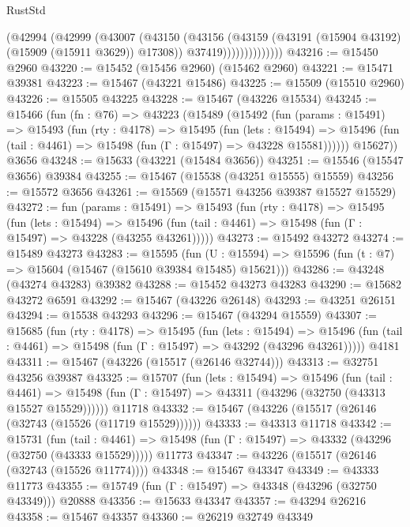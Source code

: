 \begin{lexlean}{RustStd}
\begin{coremodule}
                      (@42994
                        (@42999
                          (@43007
                            (@43150
                              (@43156
                                (@43159 (@43191 (@15904 @43192) (@15909 (@15911 @3629)) @17308))
                                @37419))))))))))))))
@43216 := @15450 @2960
@43220 := @15452 (@15456 @2960) (@15462 @2960)
@43221 := @15471 @39381
@43223 := @15467 (@43221 @15486)
@43225 := @15509 (@15510 @2960)
@43226 := @15505 @43225
@43228 := @15467 (@43226 @15534)
@43245 := @15466
    (fun (fn : @76) =>
    @43223
      (@15489
        (@15492
          (fun (params : @15491) =>
          @15493
            (fun (rty : @4178) =>
            @15495
              (fun (lets : @15494) =>
              @15496 (fun (tail : @4461) => @15498 (fun (Γ : @15497) => @43228 @15581))))))
        @15627))
    @3656
@43248 := @15633 (@43221 (@15484 @3656))
@43251 := @15546 (@15547 @3656) @39384
@43255 := @15467 (@15538 (@43251 @15555) @15559)
@43256 := @15572 @3656
@43261 := @15569 (@15571 @43256 @39387 @15527 @15529)
@43272 := fun (params : @15491) =>
  @15493
    (fun (rty : @4178) =>
    @15495
      (fun (lets : @15494) =>
      @15496 (fun (tail : @4461) => @15498 (fun (Γ : @15497) => @43228 (@43255 @43261)))))
@43273 := @15492 @43272
@43274 := @15489 @43273
@43283 := @15595
    (fun (U : @15594) => @15596 (fun (t : @7) => @15604 (@15467 (@15610 @39384 @15485) @15621)))
@43286 := @43248 (@43274 @43283) @39382
@43288 := @15452 @43273 @43283
@43290 := @15682 @43272 @6591
@43292 := @15467 (@43226 @26148)
@43293 := @43251 @26151
@43294 := @15538 @43293
@43296 := @15467 (@43294 @15559)
@43307 := @15685
    (fun (rty : @4178) =>
    @15495
      (fun (lets : @15494) =>
      @15496 (fun (tail : @4461) => @15498 (fun (Γ : @15497) => @43292 (@43296 @43261)))))
    @4181
@43311 := @15467 (@43226 (@15517 (@26146 @32744)))
@43313 := @32751 @43256 @39387
@43325 := @15707
    (fun (lets : @15494) =>
    @15496
      (fun (tail : @4461) =>
      @15498 (fun (Γ : @15497) => @43311 (@43296 (@32750 (@43313 @15527 @15529))))))
    @11718
@43332 := @15467 (@43226 (@15517 (@26146 (@32743 (@15526 (@11719 @15529))))))
@43333 := @43313 @11718
@43342 := @15731
    (fun (tail : @4461) => @15498 (fun (Γ : @15497) => @43332 (@43296 (@32750 (@43333 @15529)))))
    @11773
@43347 := @43226 (@15517 (@26146 (@32743 (@15526 @11774))))
@43348 := @15467 @43347
@43349 := @43333 @11773
@43355 := @15749 (fun (Γ : @15497) => @43348 (@43296 (@32750 @43349))) @20888
@43356 := @15633 @43347
@43357 := @43294 @26216
@43358 := @15467 @43357
@43360 := @26219 @32749 @43349

\end{coremodule}
\end{lexlean}
